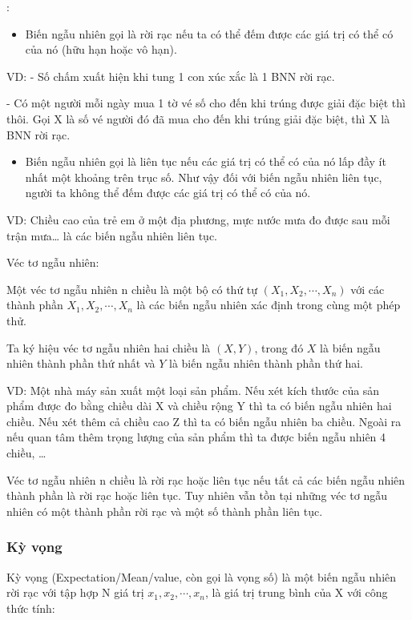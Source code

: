 \documentclass[12pt,a4paper]{article}
\begin{document}
:
\begin{itemize}
    \item Biến ngẫu nhiên gọi là rời rạc nếu ta có thể đếm được các giá trị có thể có của nó (hữu hạn hoặc vô hạn). 
\end{itemize}

VD: - Số chấm xuất hiện khi tung 1 con xúc xắc là 1 BNN rời rạc. 

- Có một người mỗi ngày mua 1 tờ vé số cho đến khi trúng được giải đặc biệt thì thôi. Gọi X là số vé người đó đã mua cho đến khi trúng giải đặc biệt, thì X là BNN rời rạc. 
\begin{itemize}
    \item Biến ngẫu nhiên gọi là liên tục nếu các giá trị có thể có của nó lấp đầy ít nhất một khoảng trên trục số. Như vậy đối với biến ngẫu nhiên liên tục, người ta không thể đếm được các giá trị có thể có của nó. 
\end{itemize}

VD: Chiều cao của trẻ em ở một địa phương, mực nước mưa đo được sau mỗi trận mưa… là các biến ngẫu nhiên liên tục.

Véc tơ ngẫu nhiên:

Một véc tơ ngẫu nhiên n chiều là một bộ có thứ tự $(X_1, X_2, \cdots, X_n)$ với các thành phần $X_1, X_2, \cdots, X_n$ là các biến ngẫu nhiên xác định trong cùng một phép thử.

Ta ký hiệu véc tơ ngẫu nhiên hai chiều là $(X, Y)$, trong đó $X$ là biến ngẫu nhiên thành phần thứ nhất và $Y$ là biến ngẫu nhiên thành phần thứ hai.

VD: Một nhà máy sản xuất một loại sản phẩm. Nếu xét kích thước của sản phẩm được đo bằng chiều dài X và chiều rộng Y thì ta có biến ngẫu nhiên hai chiều. Nếu xét thêm cả chiều cao Z thì ta có biến ngẫu nhiên ba chiều. Ngoài ra nếu quan tâm thêm trọng lượng của sản phẩm thì ta được biến ngẫu nhiên 4 chiều, …

Véc tơ ngẫu nhiên n chiều là rời rạc hoặc liên tục nếu tất cả các biến ngẫu nhiên thành phần là rời rạc hoặc liên tục. Tuy nhiên vẫn tồn tại những véc tơ ngẫu nhiên có một thành phần rời rạc và một số thành phần liên tục.
\subsubsection{Kỳ vọng}
Kỳ vọng (Expectation/Mean/value, còn gọi là vọng số) là một biến ngẫu nhiên rời rạc với tập hợp N giá trị $x_1, x_2, \cdots, x_n$, là giá trị trung bình của X với công thức tính:
\end{document}
